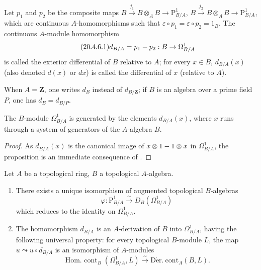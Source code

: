 \begin{definition}[20.4.6]
\label{0.20.4.6}
Let $p_1$ and $p_2$ be the composite maps $B\xrightarrow{j_1}B\otimes_A B\to\mathrm{P}^1_{B/A}$, $B\xrightarrow{j_2}B\otimes_A B\to\mathrm{P}^1_{B/A}$, which are continuous $A$-homomorphisms such that $\varepsilon\circ p_1=\varepsilon\circ p_2=1_B$.
The continuous $A$-module homomorphism
\begin{equation}
\tag{20.4.6.1}
  \label{0.20.4.6.1}
  d_{B/A} = p_1- p_2:B\to\Omega^1_{B/A}
\end{equation}
is called the exterior differential of $B$ relative to $A$; for every $x\in B$, $d_{B/A}(x)$ (also denoted $d(x)$ or $dx$) is called the differential of $x$ (relative to $A$).
\end{definition}

When $A=\mathbf{Z}$, one writes $d_B$ instead of $d_{B/\mathbf{Z}}$; if $B$ is an algebra over a prime field $P$, one has $d_B=d_{B/P}$.

\begin{proposition}[20.4.7]
\label{0.20.4.7}
The $B$-module $\Omega^1_{B/A}$ is generated by the elements $d_{B/A}(x)$, where $x$ runs through a system of generators of the $A$-algebra $B$.
\end{proposition}

\begin{proof}
As $d_{B/A}(x)$ is the canonical image of $x\otimes 1- 1\otimes x$ in $\Omega^1_{B/A}$, the proposition is an immediate consequence of .
\end{proof}

\begin{theorem}[20.4.8]
\label{0.20.4.8}
Let $A$ be a topological ring, $B$ a topological $A$-algebra.
\begin{enumerate}
  \item[\rm(i)] There exists a unique isomorphism of augmented topological $B$-algebras
\begin{equation}
\tag{20.4.8.1}
  \label{0.20.4.8.1}
  \varphi:\mathrm{P}^1_{B/A}\xrightarrow{\sim}D_B(\Omega^1_{B/A})
\end{equation}
which reduces to the identity on $\Omega^1_{B/A}$.
  \item[\rm(ii)] The homomorphism $d_{B/A}$ is an $A$-derivation of $B$ into $\Omega^1_{B/A}$, having the following universal property: for every topological $B$-module $L$, the map $u\leadsto u\circ d_{B/A}$ is an isomorphism of $A$-modules
\begin{equation}
\tag{20.4.8.2}
  \label{0.20.4.8.2}
  \operatorname{Hom.\ cont}_B(\Omega^1_{B/A},L)\xrightarrow{\sim}\operatorname{D\acute{e}r.\ cont}_A(B,L).
\end{equation}
\end{enumerate}
\end{theorem}


